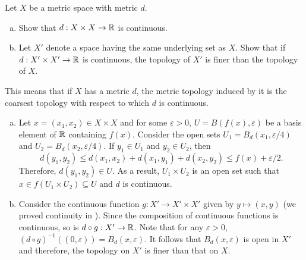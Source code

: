 	\setcounter{exercise}{2}
	\begin{exercise}
		Let $X$ be a metric space with metric $d$.
		\begin{enumerate}[(a)]
			\item Show that $d:X\times X\to\mathbb{R}$ is continuous.
			\item Let $X'$ denote a space having the same underlying set as $X$. Show that if $d:X'\times X'\to\mathbb{R}$ is continuous, the topology of $X'$ is finer than the topology of $X$.
		\end{enumerate}
		This means that if $X$ has a metric $d$, the metric topology induced by it is the coarsest topology with respect to which $d$ is continuous.
	\end{exercise}
	\begin{solution*}
		\begin{enumerate}[(a)]
			\item Let $x=(x_1,x_2)\in X\times X$ and for some $\varepsilon>0$, $U=B(f(x),\varepsilon)$ be a basis element of $\mathbb{R}$ containing $f(x)$. Consider the open sets $U_1 = B_d(x_1,\varepsilon/4)$ and $U_2 = B_d(x_2,\varepsilon/4)$. If $y_1\in U_1$ and $y_2\in U_2$, then
			\[ d(y_1,y_2) \leq d(x_1,x_2) + d(x_1,y_1) + d(x_2,y_2) \leq f(x) + \varepsilon/2. \]
			Therefore, $d(y_1,y_2)\in U$. As a result, $U_1\times U_2$ is an open set such that $x\in f(U_1\times U_2) \subseteq U$ and $d$ is continuous.
			
			\item Consider the continuous function $g : X'\to X'\times X'$ given by $y\mapsto (x,y)$ (we proved continuity in ). Since the composition of continuous functions is continuous, so is $d\circ g : X'\to\mathbb{R}$. Note that for any $\varepsilon>0$, $(d\circ g)^{-1}((0,\varepsilon)) = B_d(x,\varepsilon)$. It follows that $B_d(x,\varepsilon)$ is open in $X'$ and therefore, the topology on $X'$ is finer than that on $X$.
		\end{enumerate}
	\end{solution*}	


